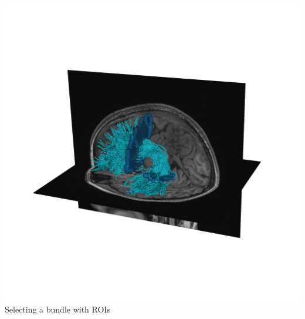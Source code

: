 \documentclass[a0paper,landscape,fontscale=0.365]{baposter}
\newenvironment{Figure}
  {\par\medskip\noindent\minipage{\linewidth}}
  {\endminipage\par\medskip}
\begin{document}
\begin{poster}
{\begin{itemize}[nosep, leftmargin=*]
\begin{multicols}{4}
\begin{Figure}
            \includegraphics[width=1.0\linewidth]{figures/arc_trk}
            Selecting a bundle with ROIs
        \end{Figure}


\end{multicols}
\end{itemize}}
\end{poster}
\end{document}

